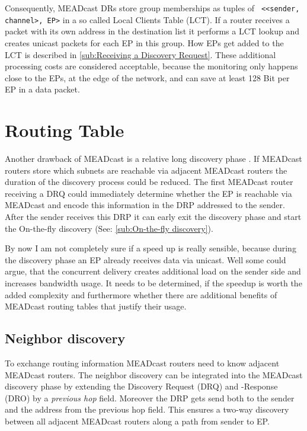 Consequently, MEADcast DRs store group memberships as tuples of \texttt{
<<sender, channel>, EP>} in a so called Local Clients Table (LCT).
If a router receives a packet with its own address in the destination list it 
performs a LCT lookup and creates unicast packets for each EP in this group.
How EPs get added to the LCT is described in
\ref{sub:Receiving a Discovery Request}.
These additional processing costs are considered acceptable, because the
monitoring only happens close to the EPs, at the edge of the network, and can
save at least 128 Bit per EP in a data packet.


\section{Routing Table} %
\label{sec:Routing Table}
Another drawback of MEADcast is a relative long discovery phase \cite{meadcast1,
meadcast2}.
If MEADcast routers store which subnets are reachable via adjacent MEADcast
routers the duration of the discovery process could be reduced.
The first MEADcast router receiving a DRQ could immediately determine whether
the EP is reachable via MEADcast and encode this information in the DRP
addressed to the sender.
After the sender receives this DRP it can early exit the discovery phase and
start the On-the-fly discovery (See: \ref{sub:On-the-fly discovery}).

By now I am not completely sure if a speed up is really sensible, because during
the discovery phase an EP already receives data via unicast.
Well some could argue, that the concurrent delivery creates additional load on
the sender side and increases bandwidth usage.
It needs to be determined, if the speedup is worth the added complexity and
furthermore whether there are additional benefits of MEADcast routing tables
that justify their usage.


\subsection{Neighbor discovery} %
\label{sub:Neighbor discovery}
To exchange routing information MEADcast routers need to know adjacent MEADcast
routers.
The neighbor discovery can be integrated into the MEADcast discovery phase by
extending the Discovery Request (DRQ) and -Response (DRO) by a \textit{previous
hop} field.
Moreover the DRP gets send both to the sender and the address from the previous
hop field.
This ensures a two-way discovery between all adjacent MEADcast routers along a
path from sender to EP.


